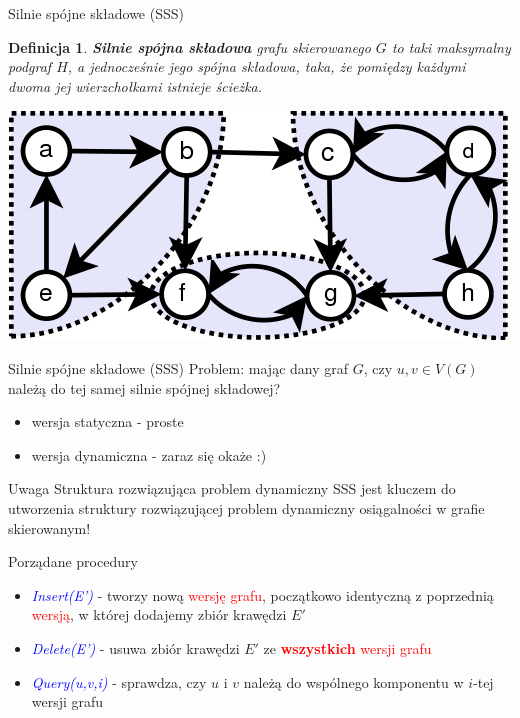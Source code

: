 \documentclass{beamer}
\newtheorem{df}{Definicja}
\newcommand{\emp}[1]{\textcolor{blue}{\textit{#1}}}
\newcommand{\red}[1]{\textcolor{red}{#1}}
\begin{document}
\begin{frame}{Silnie spójne składowe (SSS)}

\begin{df}
{\bf Silnie spójna składowa} grafu skierowanego $G$ to taki maksymalny podgraf $H$, a jednocześnie jego spójna składowa, taka, że pomiędzy każdymi dwoma jej wierzchołkami istnieje ścieżka.
\end{df}

\begin{center}
\includegraphics[scale=0.5]{img/Scc.png}
\end{center}

\end{frame}

\begin{frame}{Silnie spójne składowe (SSS)}
Problem: mając dany graf $G$, czy $u,v \in V(G)$ należą do tej samej silnie spójnej składowej?

\vspace{0.5cm}

\begin{itemize}
\item wersja statyczna - proste
\item wersja dynamiczna - zaraz się okaże :)
\end{itemize}

\vspace{0.5cm}

\begin{block}{Uwaga}
Struktura rozwiązująca problem dynamiczny SSS jest kluczem do utworzenia struktury rozwiązującej problem dynamiczny osiągalności w grafie skierowanym!
\end{block}

\end{frame}

\begin{frame}{Porządane procedury}

\begin{itemize}
\item \emp{Insert(E')} - tworzy nową \red{wersję grafu}, początkowo identyczną z poprzednią \red{wersją}, w której dodajemy zbiór krawędzi $E'$
\item \emp{Delete(E')} - usuwa zbiór krawędzi $E'$ ze \red{{\bf wszystkich} wersji grafu}
\item \emp{Query(u,v,i)} - sprawdza, czy $u$ i $v$ należą do wspólnego komponentu w $i$-tej wersji grafu
\end{itemize}

\end{frame}
\end{document}
